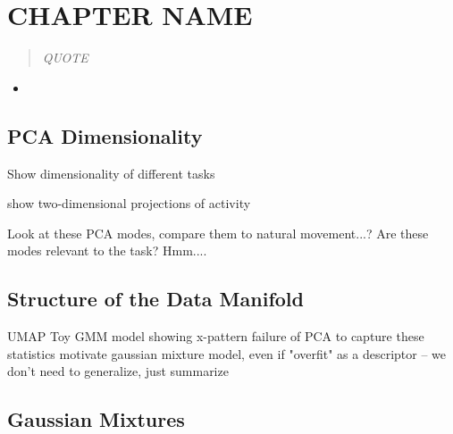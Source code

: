 \documentclass[../main.tex]{subfiles}
\begin{document}
\chapter{CHAPTER NAME}\label{chap:LABEL}

\bigskip
\begin{quote}
  \emph{QUOTE}
  
\end{quote}

\cleardoublepage%


\begin{itemize}
  \item 
\end{itemize}


\section[short]{PCA Dimensionality}

Show dimensionality of different tasks

show two-dimensional projections of activity

Look at these PCA modes, compare them to natural movement...? Are these modes relevant to the task? Hmm....

\section[short]{Structure of the Data Manifold}

UMAP
Toy GMM model showing x-pattern
failure of PCA to capture these statistics
motivate gaussian mixture model, even if "overfit" as a descriptor -- we don't need to generalize, just summarize

\section{Gaussian Mixtures}
\end{document}
